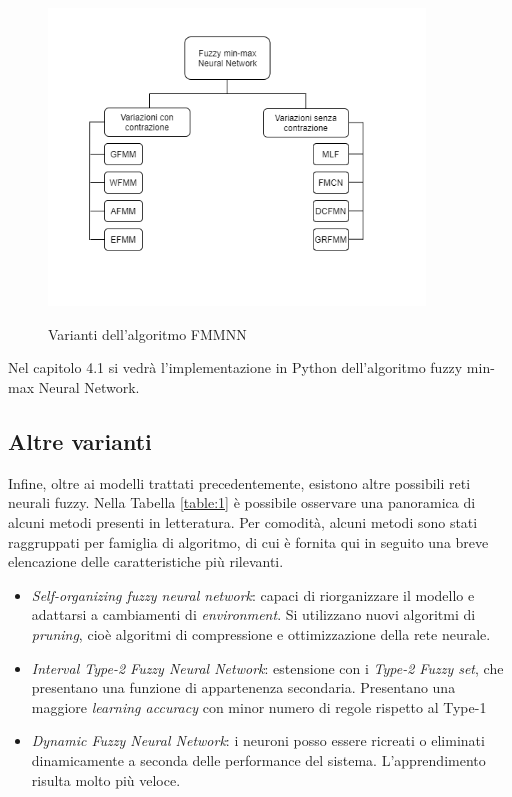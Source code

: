 \documentclass[11pt,  oneside, openany]{book}
\begin{document}
\begin{figure}[h!]
\begin{center}
  \includegraphics[width=10cm]{Immagini/varianti_FMMNN.png}\\
  \caption{Varianti dell'algoritmo FMMNN}
\end{center}
\end{figure}

Nel capitolo 4.1 si vedrà l'implementazione in Python dell'algoritmo fuzzy min-max Neural Network.

\subsection{Altre varianti}

Infine, oltre ai modelli trattati precedentemente, esistono altre possibili reti neurali fuzzy. Nella Tabella \ref{table:1} è possibile osservare una panoramica di alcuni metodi presenti in letteratura. Per comodità, alcuni metodi sono stati raggruppati per famiglia di algoritmo, di cui è fornita qui in seguito una breve elencazione delle caratteristiche più rilevanti. 

\begin{itemize}
\item \textit{Self-organizing fuzzy neural network}:  capaci di riorganizzare il modello e adattarsi a cambiamenti di \textit{environment}. Si utilizzano nuovi algoritmi di \textit{pruning}, cioè algoritmi di compressione e ottimizzazione della rete neurale. 
\item \textit{Interval Type-2 Fuzzy Neural Network}: estensione con i \textit{Type-2 Fuzzy set}, che presentano una funzione di appartenenza secondaria. Presentano una maggiore \textit{learning accuracy} con minor numero di regole rispetto al Type-1 
\item \textit{Dynamic Fuzzy Neural Network}: i neuroni posso essere ricreati o eliminati dinamicamente a seconda delle performance del sistema. L'apprendimento risulta molto più veloce. 
\end{itemize}
\end{document}
